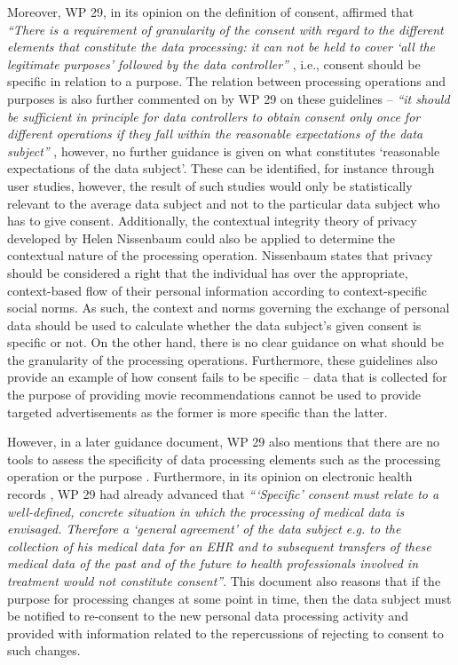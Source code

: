 Moreover, WP 29, in its opinion on the definition of consent, affirmed that \textit{``There is a requirement of granularity of the consent with regard to the different elements that constitute the data processing: it can not be held to cover `all the legitimate purposes' followed by the data controller''} \citep{article_29_data_protection_working_party_opinion_2011}, i.e., consent should be specific in relation to a purpose.
The relation between processing operations and purposes is also further commented on by WP 29 on these guidelines -- \textit{``it should be sufficient in principle for data controllers to obtain consent only once for different operations if they fall within the reasonable expectations of the data subject''} \citep{article_29_data_protection_working_party_opinion_2011}, however, no further guidance is given on what constitutes `reasonable expectations of the data subject'.
These can be identified, for instance through user studies, however, the result of such studies would only be statistically relevant to the average data subject and not to the particular data subject who has to give consent.
Additionally, the contextual integrity theory of privacy developed by Helen Nissenbaum \citep{nissenbaum_privacy_2004} could also be applied to determine the contextual nature of the processing operation.
Nissenbaum states that privacy should be considered a right that the individual has over the appropriate, context-based flow of their personal information according to context-specific social norms.
As such, the context and norms governing the exchange of personal data should be used to calculate whether the data subject's given consent is specific or not.
On the other hand, there is no clear guidance on what should be the granularity of the processing operations.
Furthermore, these guidelines also provide an example of how consent fails to be specific -- data that is collected for the purpose of providing movie recommendations cannot be used to provide targeted advertisements as the former is more specific than the latter.

However, in a later guidance document, WP 29 also mentions that there are no tools to assess the specificity of data processing elements such as the processing operation or the purpose
\citep{article_29_data_protection_working_party_article_2016}.
Furthermore, in its opinion on electronic health records \citep{article_29_data_protection_working_party_working_2007}, WP 29 had already advanced that \textit{```Specific' consent must relate to a well-defined, concrete situation in which the processing of medical data is envisaged. Therefore a `general agreement' of the data subject e.g. to the collection of his medical data for an EHR and to subsequent transfers of these medical data of the past and of the future to health professionals involved in treatment would not constitute consent''}.
This document also reasons that if the purpose for processing changes at some point in time, then the data subject must be notified to re-consent to the new personal data processing activity and provided with information related to the repercussions of rejecting to consent to such changes.

